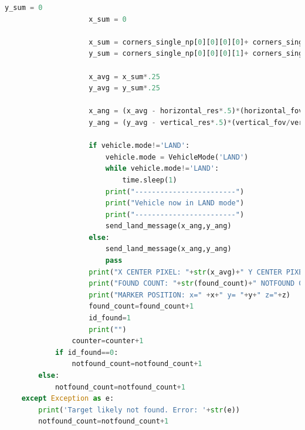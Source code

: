 \documentclass{article}
\begin{document}
\begin{lstlisting}[language=Python]
                    y_sum = 0
                    x_sum = 0

                    x_sum = corners_single_np[0][0][0][0]+ corners_single_np[0][0][1][0]+ corners_single_np[0][0][2][0]+ corners_single_np[0][0][3][0]
                    y_sum = corners_single_np[0][0][0][1]+ corners_single_np[0][0][1][1]+ corners_single_np[0][0][2][1]+ corners_single_np[0][0][3][1]

                    x_avg = x_sum*.25
                    y_avg = y_sum*.25
            
                    x_ang = (x_avg - horizontal_res*.5)*(horizontal_fov/horizontal_res)
                    y_ang = (y_avg - vertical_res*.5)*(vertical_fov/vertical_res)
            
                    if vehicle.mode!='LAND':
                        vehicle.mode = VehicleMode('LAND')
                        while vehicle.mode!='LAND':
                            time.sleep(1)
                        print("------------------------")
                        print("Vehicle now in LAND mode")
                        print("------------------------")
                        send_land_message(x_ang,y_ang)
                    else:
                        send_land_message(x_ang,y_ang)
                        pass
                    print("X CENTER PIXEL: "+str(x_avg)+" Y CENTER PIXEL: "+str(y_avg))
                    print("FOUND COUNT: "+str(found_count)+" NOTFOUND COUNT: "+str(notfound_count))
                    print("MARKER POSITION: x=" +x+" y= "+y+" z="+z)
                    found_count=found_count+1
                    id_found=1
                    print("")
                counter=counter+1
            if id_found==0:
                notfound_count=notfound_count+1
        else:
            notfound_count=notfound_count+1
    except Exception as e:
        print('Target likely not found. Error: '+str(e))
        notfound_count=notfound_count+1
    

\end{lstlisting}
\end{document}
